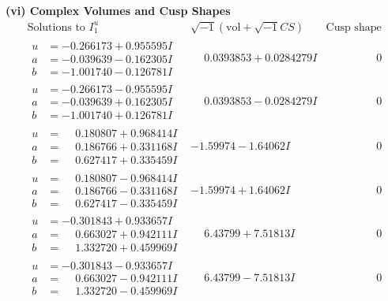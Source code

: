 \documentclass[1p]{elsarticle_modified}
\theoremstyle{definition}
\newcommand{\I}{\sqrt{-1}}
\begin{document}
\newpage\flushleft \textbf{(vi) Complex Volumes and Cusp Shapes}
$$\begin{array}{c|c|c}  
\text{Solutions to }I^u_{1}& \I (\text{vol} + \sqrt{-1}CS) & \text{Cusp shape}\\
 \hline 
\begin{aligned}
u &= -0.266173 + 0.955595 I \\
a &= -0.039639 - 0.162305 I \\
b &= -1.001740 - 0.126781 I\end{aligned}
 & \phantom{-}0.0393853 + 0.0284279 I & \phantom{-0.000000 } 0 \\ \hline\begin{aligned}
u &= -0.266173 - 0.955595 I \\
a &= -0.039639 + 0.162305 I \\
b &= -1.001740 + 0.126781 I\end{aligned}
 & \phantom{-}0.0393853 - 0.0284279 I & \phantom{-0.000000 } 0 \\ \hline\begin{aligned}
u &= \phantom{-}0.180807 + 0.968414 I \\
a &= \phantom{-}0.186766 + 0.331168 I \\
b &= \phantom{-}0.627417 + 0.335459 I\end{aligned}
 & -1.59974 - 1.64062 I & \phantom{-0.000000 } 0 \\ \hline\begin{aligned}
u &= \phantom{-}0.180807 - 0.968414 I \\
a &= \phantom{-}0.186766 - 0.331168 I \\
b &= \phantom{-}0.627417 - 0.335459 I\end{aligned}
 & -1.59974 + 1.64062 I & \phantom{-0.000000 } 0 \\ \hline\begin{aligned}
u &= -0.301843 + 0.933657 I \\
a &= \phantom{-}0.663027 + 0.942111 I \\
b &= \phantom{-}1.332720 + 0.459969 I\end{aligned}
 & \phantom{-}6.43799 + 7.51813 I & \phantom{-0.000000 } 0 \\ \hline\begin{aligned}
u &= -0.301843 - 0.933657 I \\
a &= \phantom{-}0.663027 - 0.942111 I \\
b &= \phantom{-}1.332720 - 0.459969 I\end{aligned}
 & \phantom{-}6.43799 - 7.51813 I & \phantom{-0.000000 } 0 \\ \hline\begin{aligned}

\end{aligned}
\end{array}$$
\end{document}
